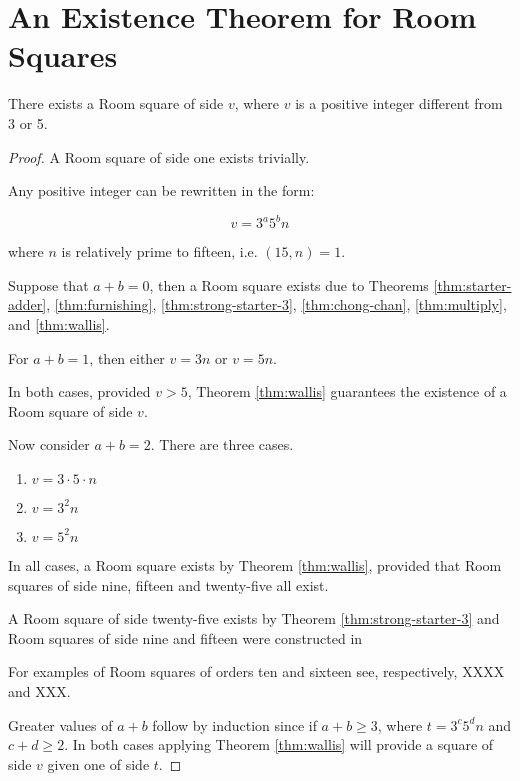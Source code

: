 \chapter{An Existence Theorem for Room Squares}
\label{ch:existence-theorem}

\begin{theorem}
There exists a Room square of side $v$, where $v$ is a positive integer different from 3 or 5.
\end{theorem}

\begin{proof}
A Room square of side one exists trivially.

Any positive integer can be rewritten in the form:

\begin{equation}
v = 3^{a}5^{b}n
\end{equation}

where $n$ is relatively prime to fifteen, i.e.  $(15, n) = 1$.

Suppose that $a + b = 0$, then a Room square exists due to Theorems
\ref{thm:starter-adder},
\ref{thm:furnishing},
\ref{thm:strong-starter-3},
\ref{thm:chong-chan},
\ref{thm:multiply},
and
\ref{thm:wallis}.

For $a + b = 1$, then either $v = 3n$ or $v = 5n$.

In both cases, provided $v > 5$, Theorem \ref{thm:wallis} guarantees the existence of a Room square of side $v$.

Now consider $a + b = 2$.
There are three cases.

\begin{enumerate}
  \item{$v = 3\cdot 5\cdot n$}
  \item{$v = 3^{2}n$}
  \item{$v = 5^{2}n$}
\end{enumerate}

In all cases, a Room square exists by Theorem \ref{thm:wallis}, provided that Room squares of side nine, fifteen and twenty-five all exist.

A Room square of side twenty-five exists by Theorem \ref{thm:strong-starter-3} and Room squares of side nine and fifteen were constructed in
\cite{mullinFurnishingRoomSquares1969}

For examples of Room squares of orders ten and sixteen see, respectively, XXXX and XXX.

Greater values of $a + b$ follow by induction since if $a + b \geq 3$, where $t = 3^{c}5^{d}n$ and $c + d \geq 2$.
In both cases applying Theorem \ref{thm:wallis} will provide a square of side $v$ given one of side $t$.

\end{proof}
